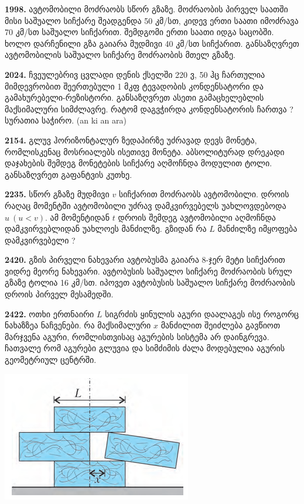 \documentclass[12pt,a4paper,]{report}
\begin{document}
\textbf{1998.} ავტომობილი მოძრაობს სწორ გზაზე. მოძრაობის პირველ საათში მისი საშუალო სიჩქარე შეადგენდა 50 კმ/სთ, კიდევ ერთი საათი იმოძრავა 70 კმ/სთ საშუალო სიჩქარით. შემდგომი ერთი საათი იდგა საცობში. ხოლო დარჩენილი გზა გაიარა მუდმივი 40 კმ/სთ სიჩქარით. განსაზღვრეთ ავტომობილის საშუალო სიჩქარე მოძრაობის მთელ გზაზე.

\textbf{2024.} ჩვეულებრივ ცვლადი დენის ქსელში 220 ვ, 50 ჰც ჩართულია მიმდევრობით შეერთებული 1 მკფ ტევადობის კონდენსატორი და გამახურებელი-რეზისტორი. განსაზღვრეთ  ასეთი გამაცხელებლის მაქსიმალური სიმძლავრე. რატომ დაგვჭირდა კონდენსატორის ჩართვა ? 
სურათია საჭირო. (an ki an ara)

\textbf{2154.} გლუვ ჰორიზონტალურ ზედაპირზე უძრავად დევს მონეტა, რომლისკენაც მოსრიალებს ისეთივე მონეტა. აბსოლიტურად დრეკადი დაჯახების შემდეგ მონეტების სიჩქარე აღმოჩნდა მოდულით ტოლი. განსაზღვრეთ გაფანტვის კუთხე.

\textbf{2235.} სწორ გზაზე მუდმივი $v$ სიჩქარით მოძრაობს ავტომობილი. დროის რაღაც მომენტში ავტომობილი უძრავ დამკვირვებელს უახლოვდებოდა $u\ (u<v)$. ამ მომენტიდან $t$ დროის შემდეგ ავტომობილი აღმოჩნდა დამკვირვებლიდან უახლოეს მანძილზე. გზიდან რა $L$ მანძილზე იმყოფება დამკვირვებელი ? 

\textbf{2420.} გზის პირველი ნახევარი ავტობუსმა გაიარა 8-ჯერ მეტი სიჩქარით ვიდრე მეორე ნახევარი. ავტობუსის საშუალო სიჩქარე მოძრაობის სრულ გზაზე ტოლია 16 კმ/სთ. იპოვეთ ავტობუსის საშუალო სიჩქარე მოძრაობის დროის პირველ მესამედში.

\textbf{2422.} ოთხი ერთნაირი $L$ სიგრძის ყინულის აგური დაალაგეს ისე როგორც ნახაზზეა ნაჩვენები. რა მაქსიმალური $x$ მანძილით შეიძლება გავწიოთ მარჯვენა აგური, რომლისთვისაც აგურების სისტემა არ დაინგრევა. ჩათვალე რომ აგურები გლუვია და სიმძიმის ძალა მოდებულია აგურის გეომეტრიულ ცენტრში.
		\begin{center}
			\includegraphics[scale=0.6]{images/F2422.png}
		\end{center}
\end{document}
